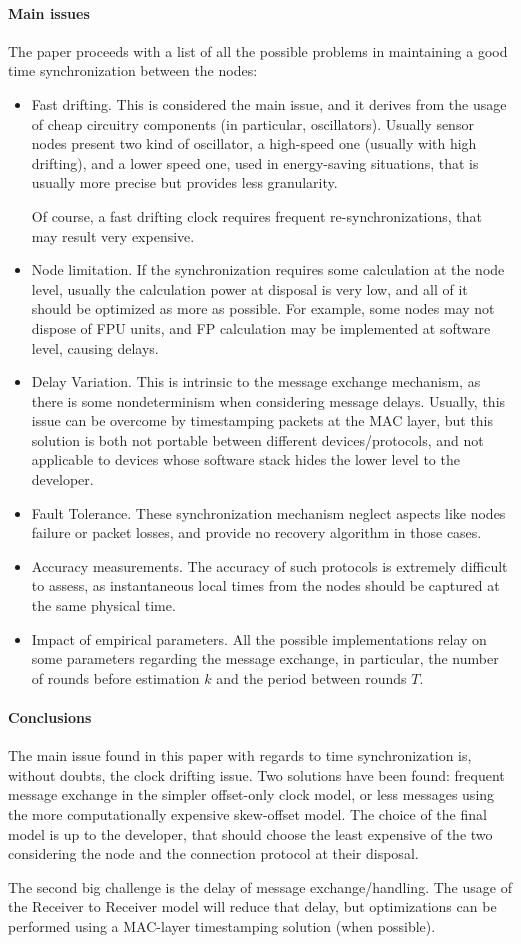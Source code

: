 \paragraph{Main issues} The paper proceeds with a list of all the possible problems in maintaining a good time synchronization between the nodes:
\begin{itemize}
    \item Fast drifting. This is considered the main issue, and it derives from the usage of cheap circuitry components (in particular, oscillators). Usually sensor nodes present two kind of oscillator, a high-speed one (usually with high drifting), and a lower speed one, used in energy-saving situations, that is usually more precise but provides less granularity. 

    Of course, a fast drifting clock requires frequent re-synchronizations, that may result very expensive. 
    \item Node limitation. If the synchronization requires some calculation at the node level, usually the calculation power at disposal is very low, and all of it should be optimized as more as possible. For example, some nodes may not dispose of FPU units, and FP calculation may be implemented at software level, causing delays.
    \item Delay Variation. This is intrinsic to the message exchange mechanism, as there is some nondeterminism when considering message delays. Usually, this issue can be overcome by timestamping packets at the MAC layer, but this solution is both not portable between different devices/protocols, and not applicable to devices whose software stack hides the lower level to the developer.
    \item Fault Tolerance. These synchronization mechanism neglect aspects like nodes failure or packet losses, and provide no recovery algorithm in those cases.
    \item Accuracy measurements. The accuracy of such protocols is extremely difficult to assess, as instantaneous local times from the nodes should be captured at the same physical time. 
    \item Impact of empirical parameters. All the possible implementations relay on some parameters regarding the message exchange, in particular, the number of rounds before estimation \(k\) and the period between rounds \(T\). 
    
\end{itemize}

\paragraph{Conclusions}
The main issue found in this paper with regards to time synchronization is, without doubts, the clock drifting issue. Two solutions have been found: frequent message exchange in the simpler offset-only clock model, or less messages using the more computationally expensive skew-offset model. The choice of the final model is up to the developer, that should choose the least expensive of the two considering the node and the connection protocol at their disposal.

The second big challenge is the delay of message exchange/handling. The usage of the Receiver to Receiver model will reduce that delay, but optimizations can be performed using a MAC-layer timestamping solution (when possible).  